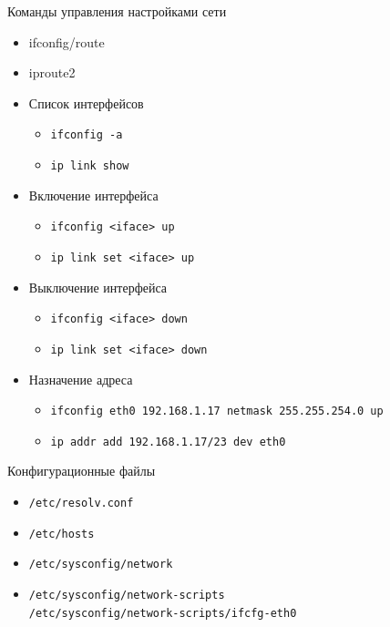 \documentclass[ignorenonframetext, professionalfonts, hyperref={pdftex, unicode}]{beamer}
\begin{document}
\begin{frame}{Команды управления настройками сети}
	\begin{itemize}
	  \item ifconfig/route
	  \item iproute2
	\end{itemize}

	\begin{itemize}
		\item Список интерфейсов
			\begin{itemize}
				\item {\tt ifconfig -a}
				\item {\tt ip link show}
			\end{itemize}
		\item Включение интерфейса 
			\begin{itemize}
				\item {\tt ifconfig <iface> up}
				\item {\tt ip link set <iface> up}
			\end{itemize}
	  \item Выключение интерфейса
			\begin{itemize}
				\item {\tt ifconfig <iface> down}
				\item {\tt ip link set <iface> down}
			\end{itemize}
	  \item Назначение адреса
			\begin{itemize}
				\item {\tt ifconfig eth0 192.168.1.17 netmask 255.255.254.0 up}
				\item {\tt ip addr add 192.168.1.17/23 dev eth0}
			\end{itemize}
	\end{itemize}
\end{frame}

\begin{frame}{Конфигурационные файлы}
  \begin{itemize}
    \item {\tt /etc/resolv.conf}
    \item {\tt /etc/hosts}
	\item {\tt /etc/sysconfig/network}
    \item {\tt /etc/sysconfig/network-scripts}\\
		{\tt /etc/sysconfig/network-scripts/ifcfg-eth0}
  \end{itemize}
\end{frame}
\end{document}
